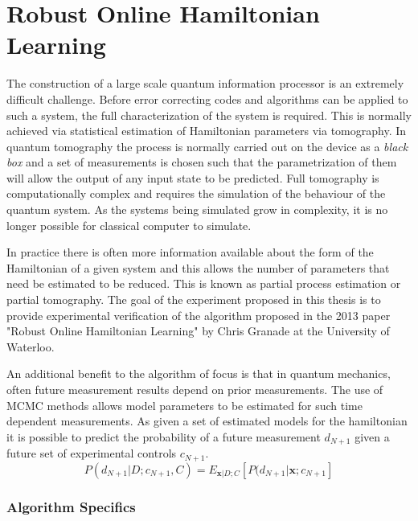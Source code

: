\section{Robust Online Hamiltonian Learning}
\label{sec:robusthamiltonian}
The construction of a large scale quantum information processor is an extremely difficult challenge. Before error correcting codes and algorithms can be applied to such a system, the full characterization of the system is required. This is normally achieved via statistical estimation of Hamiltonian parameters via tomography. In quantum tomography the process is normally carried out on the device as a \textit{black box} and a set of measurements is chosen such that the parametrization of them will allow the output of any input state to be predicted.\cite{tomography} Full tomography is computationally complex and requires the simulation of the behaviour of the quantum system. As the systems being simulated grow in complexity, it is no longer possible for classical computer to simulate.\cite{simulate}

In practice there is often more information available about the form of the Hamiltonian of a given system and this allows the number of parameters that need be estimated to be reduced. This is known as partial process estimation or partial tomography. The goal of the experiment proposed in this thesis is to provide experimental verification of the algorithm proposed in the 2013 paper "Robust Online Hamiltonian Learning" by Chris Granade at the University of Waterloo.\cite{hamiltonian_learning} 

An additional benefit to the algorithm of focus is that in quantum mechanics, often future measurement results depend on prior measurements. The use of MCMC methods allows model parameters to be estimated for such time dependent measurements. As given a set of estimated models for the hamiltonian it is possible to predict the probability of a future measurement $d_{N+1}$ given a future set of experimental controls $c_{N+1}$. 
\begin{equation}
P(d_{N+1}\big|D;c_{N+1},C) = E_{\mathbf{x}|D;C}[P(d_{N+1}\big|\mathbf{x};c_{N+1}]
\label{eq:batch}
\end{equation}

\subsubsection{Algorithm Specifics}
